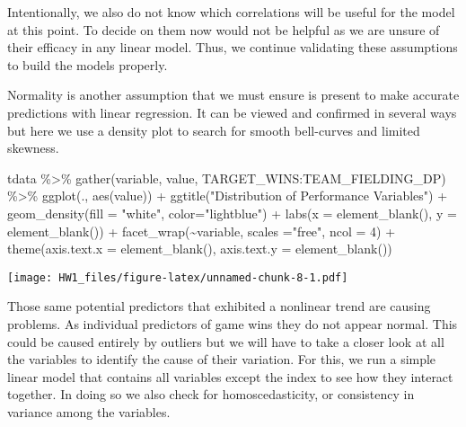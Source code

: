 \documentclass[
]{article}
\newenvironment{Shaded}{\begin{snugshade}}{\end{snugshade}}
\newcommand{\AttributeTok}[1]{\textcolor[rgb]{0.77,0.63,0.00}{#1}}
\newcommand{\DecValTok}[1]{\textcolor[rgb]{0.00,0.00,0.81}{#1}}
\newcommand{\FunctionTok}[1]{\textcolor[rgb]{0.00,0.00,0.00}{#1}}
\newcommand{\NormalTok}[1]{#1}
\newcommand{\SpecialCharTok}[1]{\textcolor[rgb]{0.00,0.00,0.00}{#1}}
\newcommand{\StringTok}[1]{\textcolor[rgb]{0.31,0.60,0.02}{#1}}
\begin{document}
Intentionally, we also do not know which correlations will be useful for
the model at this point. To decide on them now would not be helpful as
we are unsure of their efficacy in any linear model. Thus, we continue
validating these assumptions to build the models properly.

Normality is another assumption that we must ensure is present to make
accurate predictions with linear regression. It can be viewed and
confirmed in several ways but here we use a density plot to search for
smooth bell-curves and limited skewness.

\begin{Shaded}
\begin{Highlighting}[]
\NormalTok{tdata }\SpecialCharTok{\%\textgreater{}\%}
  \FunctionTok{gather}\NormalTok{(variable, value, TARGET\_WINS}\SpecialCharTok{:}\NormalTok{TEAM\_FIELDING\_DP) }\SpecialCharTok{\%\textgreater{}\%}
  \FunctionTok{ggplot}\NormalTok{(., }\FunctionTok{aes}\NormalTok{(value))  }\SpecialCharTok{+} 
  \FunctionTok{ggtitle}\NormalTok{(}\StringTok{"Distribution of Performance Variables"}\NormalTok{) }\SpecialCharTok{+} 
  \FunctionTok{geom\_density}\NormalTok{(}\AttributeTok{fill =} \StringTok{"white"}\NormalTok{, }\AttributeTok{color=}\StringTok{"lightblue"}\NormalTok{) }\SpecialCharTok{+} 
  \FunctionTok{labs}\NormalTok{(}\AttributeTok{x =} \FunctionTok{element\_blank}\NormalTok{(), }\AttributeTok{y =} \FunctionTok{element\_blank}\NormalTok{()) }\SpecialCharTok{+} 
  \FunctionTok{facet\_wrap}\NormalTok{(}\SpecialCharTok{\textasciitilde{}}\NormalTok{variable, }\AttributeTok{scales =}\StringTok{"free"}\NormalTok{, }\AttributeTok{ncol =} \DecValTok{4}\NormalTok{) }\SpecialCharTok{+}
  \FunctionTok{theme}\NormalTok{(}\AttributeTok{axis.text.x =} \FunctionTok{element\_blank}\NormalTok{(), }\AttributeTok{axis.text.y =} \FunctionTok{element\_blank}\NormalTok{())}
\end{Highlighting}
\end{Shaded}

\texttt{[image: HW1\_files/figure-latex/unnamed-chunk-8-1.pdf]}

Those same potential predictors that exhibited a nonlinear trend are
causing problems. As individual predictors of game wins they do not
appear normal. This could be caused entirely by outliers but we will
have to take a closer look at all the variables to identify the cause of
their variation. For this, we run a simple linear model that contains
all variables except the index to see how they interact together. In
doing so we also check for homoscedasticity, or consistency in variance
among the variables.
\end{document}
